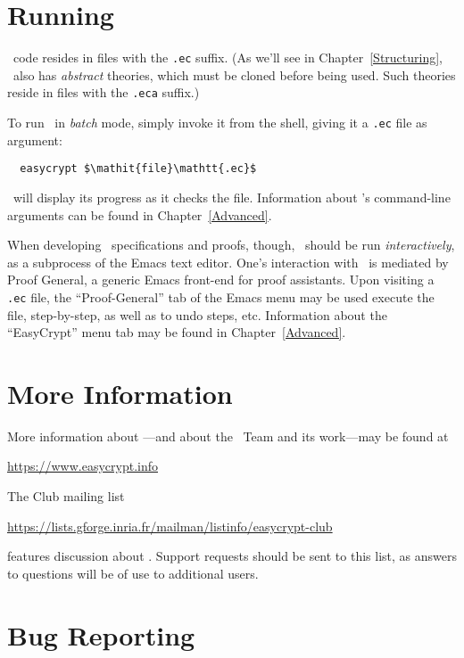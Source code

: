 \section{Running \EasyCrypt}

\EasyCrypt\ code resides in files with the \texttt{.ec} suffix. (As
we'll see in Chapter~\ref{Structuring}, \EasyCrypt\ also has
\emph{abstract} theories, which must be cloned before being used. Such
theories reside in files with the \texttt{.eca} suffix.)

To run
\EasyCrypt\ in \emph{batch} mode, simply invoke it from the shell,
giving it a \texttt{.ec} file as argument:
\begin{lstlisting}
  easycrypt $\mathit{file}\mathtt{.ec}$
\end{lstlisting}
\EasyCrypt\ will display its progress as it checks the file.
Information about \EasyCrypt's command-line arguments can be found
in Chapter~\ref{Advanced}.

When developing \EasyCrypt\ specifications and proofs, though,
\EasyCrypt\ should be run \emph{interactively}, as a subprocess of the
Emacs text editor. One's interaction with \EasyCrypt\ is mediated by
Proof General, a generic Emacs front-end for proof assistants.  Upon
visiting a \texttt{.ec} file, the ``Proof-General'' tab of the Emacs menu
may be used execute the file, step-by-step, as well as to undo
steps, etc. Information about the ``EasyCrypt'' menu tab may be
found in Chapter~\ref{Advanced}.

\section{More Information}

More information about \EasyCrypt---and about the \EasyCrypt\ Team
and its work---may be found at
\begin{center}
  \url{https://www.easycrypt.info}
\end{center}
The \EasyCrypt Club mailing list
\begin{center}
  \url{https://lists.gforge.inria.fr/mailman/listinfo/easycrypt-club}
\end{center}
features discussion about \EasyCrypt.
Support requests should be sent to this list, as answers to questions
will be of use to additional users.

\section{Bug Reporting}

